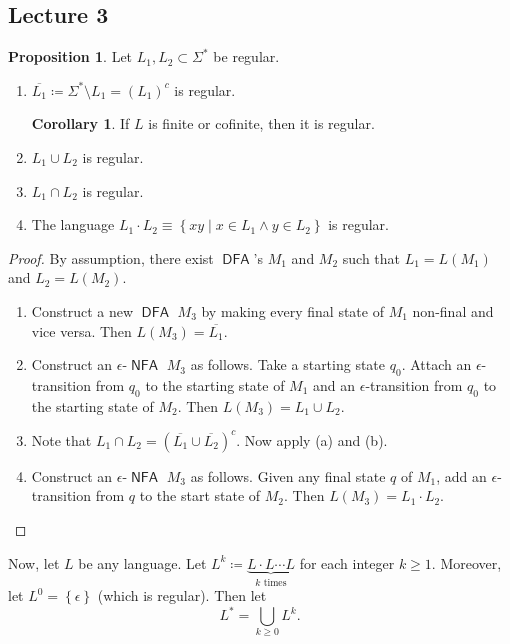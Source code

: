\documentclass[10pt,letterpaper,cm]{nupset}
\theoremstyle{definition}
\theoremstyle{theorem}
\newtheorem{prop}[definition]{Proposition}
\newtheorem{corollary}[definition]{Corollary}
\theoremstyle{remark}
\newcommand{\1}{\mathbf{1}}
\newcommand{\0}{\vec 0}
\DeclareMathOperator{\DFA}{\mathsf{DFA}}
\DeclareMathOperator{\NFA}{\mathsf{NFA}}
\begin{document}
\subsection{Lecture 3}

\begin{prop} Let $L_1, L_2\subset \Sigma^{\ast}$ be regular. 
\begin{enumerate}[label=(\alph*)]
\item $\overline{L_1}\coloneqq \Sigma^{\ast} \setminus L_1 = \left(L_1\right)^c$ is regular.
\begin{corollary}
If $L$ is finite or cofinite, then it is regular.
\end{corollary}
\item $L_1 \cup L_2$ is regular.
\item $L_1 \cap L_2$ is regular. 
\item The language $L_1\cdot L_2 \equiv  \left\{xy \mid x\in L_1 \land y\in L_2\right\}$ is regular. 
\end{enumerate}
\end{prop} 
\begin{proof} By assumption, there exist $\DFA$'s $M_1$ and $M_2$ such that $L_1 = L(M_1)$ and $L_2 = L(M_2)$.
\begin{enumerate}[label=(\alph*)]
\item Construct a new $\DFA$ $M_3$ by making every final state of $M_1$ non-final and vice versa. Then $L(M_3) = \overline{L_1}$.
\item Construct an $\epsilon{\text{-}}\NFA$ $M_3$ as follows. Take a starting state $q_0$. Attach  an $\epsilon$-transition  from $q_0$ to the starting state of $M_1$  and  an $\epsilon$-transition from $q_0$ to the starting state of $M_2$. Then $L(M_3) = L_1 \cup L_2$.
\item Note that $L_1 \cap L_2 = \left(\overline{L_1} \cup \overline{L_2}\right)^c$.  Now apply (a) and (b).
\item Construct an $\epsilon{\text{-}}\NFA$ $M_3$ as follows. Given any final state $q$ of $M_1$, add an $\epsilon$-transition from $q$ to the start state of $M_2$. Then $L(M_3) = L_1\cdot L_2$.
\end{enumerate}
\end{proof}

\medskip

Now, let $L$ be any language. Let $L^k \coloneqq \underbrace{L\cdot L \cdots L}_{k \text{ times}}$ for each integer $k\geq 1$. Moreover, let $L^0 = \left\{\epsilon\right\}$ (which is regular). Then let $$L^{\ast} = \bigcup_{k\geq 0} L^k.$$
\end{document}
